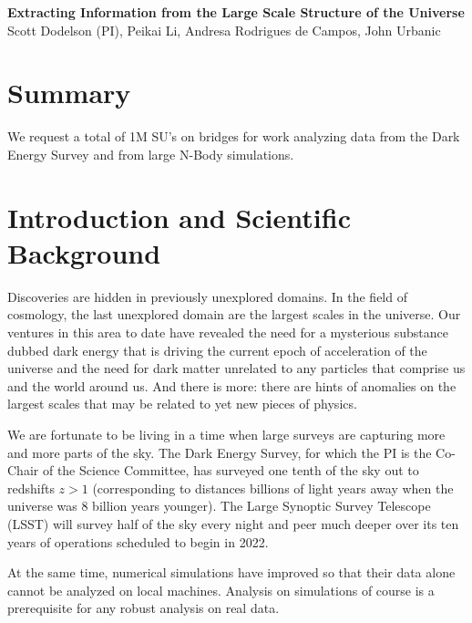 \documentclass[12pt]{article}
\begin{document}
\topmargin=-2.105cm
\oddsidemargin=-0.1cm
\evensidemargin=0cm

\begin{center}
{\bf Extracting Information from the Large Scale Structure of the Universe\\}
Scott Dodelson (PI), Peikai Li, Andresa Rodrigues de Campos, John Urbanic
\end{center}

\begin{small}


\section*{Summary} We request a total of 1M SU's on bridges for work analyzing data from the Dark Energy Survey and from large N-Body simulations.

\section{Introduction and Scientific Background}

Discoveries are hidden in previously unexplored domains. In the field of cosmology, the last unexplored domain are the largest scales in the universe. Our ventures in this area to date have revealed the need for a mysterious substance dubbed dark energy that is driving the current epoch of acceleration of the universe and the need for dark matter unrelated to any particles that comprise us and the world around us. And there is more: there are hints of anomalies on the largest scales that may be related to yet new pieces of physics. 

We are fortunate to be living in a time when large surveys are capturing more and more parts of the sky. The Dark Energy Survey, for which the PI is the Co-Chair of the Science Committee, has surveyed one tenth of the sky out to redshifts $z>1$ (corresponding to distances billions of light years away when the universe was 8 billion years younger). The Large Synoptic Survey Telescope (LSST) will survey half of the sky every night and peer much deeper over its ten years of operations scheduled to begin in 2022. 

At the same time, numerical simulations have improved so that their data alone cannot be analyzed on local machines. Analysis on simulations of course is a prerequisite for any robust analysis on real data. 


\end{small}
\end{document}
